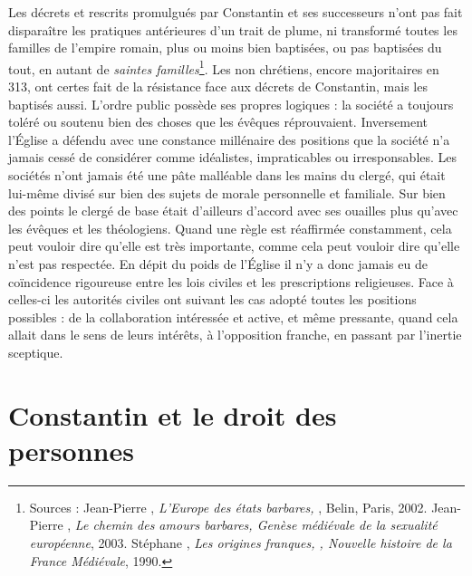  Les décrets et rescrits promulgués par Constantin et ses successeurs n'ont pas fait disparaître les pratiques antérieures d'un trait de plume, ni transformé toutes les familles de l'empire romain, plus ou moins bien baptisées, ou pas baptisées du tout, en autant de \emph{saintes familles}\footnote{Sources : Jean-Pierre , \emph{L'Europe des états barbares, }, Belin, Paris, 2002. Jean-Pierre , \emph{Le chemin des amours barbares, Genèse médiévale de la sexualité européenne}, 2003. Stéphane , \emph{Les origines franques, , Nouvelle histoire de la France Médiévale}, 1990.}. Les non chrétiens, encore majoritaires en 313, ont certes fait de la résistance face aux décrets de Constantin, mais les baptisés aussi. L'ordre public possède ses propres logiques : la société a toujours toléré ou soutenu bien des choses que les évêques réprouvaient. Inversement l'Église a défendu avec une constance millénaire des positions que la société n'a jamais cessé de considérer comme idéalistes, impraticables ou irresponsables. Les sociétés n'ont jamais été une pâte malléable dans les mains du clergé, qui était lui-même divisé sur bien des sujets de morale personnelle et familiale. Sur bien des points le clergé de base était d'ailleurs d'accord avec ses ouailles plus qu'avec les évêques et les théologiens. Quand une règle est réaffirmée constamment, cela peut vouloir dire qu'elle est très importante, comme cela peut vouloir dire qu'elle n'est pas respectée. En dépit du poids de l'Église il n'y a donc jamais eu de coïncidence rigoureuse entre les lois civiles et les prescriptions religieuses. Face à celles-ci les autorités civiles ont suivant les cas adopté toutes les positions possibles : de la collaboration intéressée et active, et même pressante, quand cela allait dans le sens de leurs intérêts, à l'opposition franche, en passant par l'inertie sceptique. 


\section{Constantin et le droit des personnes}


